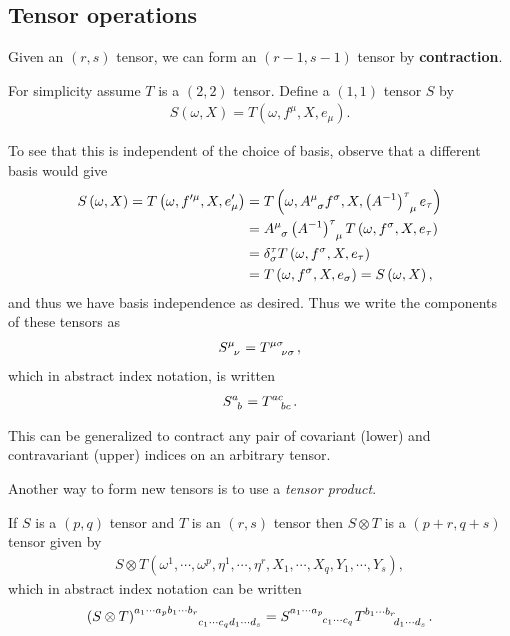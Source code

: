 \subsection{Tensor operations}

\begin{definition}
    Given an $\left( r,s \right) $ tensor, we can form an $\left( r-1,s-1 \right) $ tensor by \textbf{contraction}. 
\end{definition}

For simplicity assume $T$ is a $\left( 2,2 \right) $ tensor. Define a $\left( 1,1 \right) $ tensor $S$ by
\begin{align}
    S \left( \omega, X \right) = T\left( \omega, f^{\mu},X, e_\mu\right) 
.\end{align}

To see that this is independent of the choice of basis, observe that a different basis would give
\begin{align}
    S\left( \omega, X \right) = T \left( \omega, f'^{\mu}, X, e'_{\mu} \right) &= T \left( \omega, \tensor{A}{^{\mu}_\sigma} f^{\sigma}, X, \tensor{\left( A^{-1} \right) }{^{\tau}_\mu} e_\tau \right)  \\
    &= \tensor{A}{^{\mu}_\sigma} \tensor{\left( A^{-1} \right) }{^{\tau}_\mu} T \left( \omega, f^{\sigma}, X, e_{\tau} \right)  \\
    &= \delta_{\sigma}^{\tau} T \left( \omega, f^{\sigma}, X, e_{\tau} \right)  \\
    &= T \left( \omega, f^{\sigma}, X, e_{\sigma} \right) = S \left( \omega, X \right) 
,\end{align}
and thus we have basis independence as desired. Thus we write the components of these tensors as
\begin{align}
    \tensor{S}{^{\mu}_{\nu}} = \tensor{T}{^{\mu \sigma}_{\nu \sigma}}
,\end{align}
which in abstract index notation, is written
\begin{align}
    \tensor{S}{^{a}_b} = \tensor{T}{^{ac}_{bc}}
.\end{align}

This can be generalized to contract any pair of covariant (lower) and contravariant (upper) indices on an arbitrary tensor.

Another way to form new tensors is to use a \textit{tensor product}.

\begin{definition}
    If $S$ is a $\left( p,q \right) $ tensor and $T$ is an $\left( r,s \right) $ tensor then $S \otimes T$ is a $\left( p + r, q + s \right) $ tensor given by
    \begin{align}
        S \otimes T \left( \omega^{1}, \cdots, \omega^{p}, \eta^{1}, \cdots, \eta^{r}, X_1, \cdots, X_q, Y_1, \cdots, Y_s \right) 
    ,\end{align}
    which in abstract index notation can be written
    \begin{align}
        \tensor{\left( S \otimes T \right)}{^{a_1 \cdots a_p b_1 \cdots b_r}_{c_1 \cdots c_q d_1 \cdots d_s}} = \tensor{S}{^{a_1 \cdots a_p}_{c_1 \cdots c_q}} \tensor{T}{^{b_1 \cdots b_r}_{d_1 \cdots d_s}}
    .\end{align}
\end{definition}

